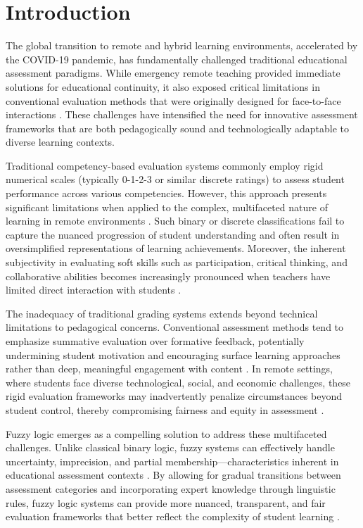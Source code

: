 

\section{Introduction}

The global transition to remote and hybrid learning environments, accelerated by the COVID-19 pandemic, has fundamentally challenged traditional educational assessment paradigms. While emergency remote teaching provided immediate solutions for educational continuity, it also exposed critical limitations in conventional evaluation methods that were originally designed for face-to-face interactions \cite{Martinez2022}. These challenges have intensified the need for innovative assessment frameworks that are both pedagogically sound and technologically adaptable to diverse learning contexts.

Traditional competency-based evaluation systems commonly employ rigid numerical scales (typically 0-1-2-3 or similar discrete ratings) to assess student performance across various competencies. However, this approach presents significant limitations when applied to the complex, multifaceted nature of learning in remote environments \cite{Chen2024}. Such binary or discrete classifications fail to capture the nuanced progression of student understanding and often result in oversimplified representations of learning achievements. Moreover, the inherent subjectivity in evaluating soft skills such as participation, critical thinking, and collaborative abilities becomes increasingly pronounced when teachers have limited direct interaction with students \cite{Kumar2024}.

The inadequacy of traditional grading systems extends beyond technical limitations to pedagogical concerns. Conventional assessment methods tend to emphasize summative evaluation over formative feedback, potentially undermining student motivation and encouraging surface learning approaches rather than deep, meaningful engagement with content \cite{Anderson2022}. In remote settings, where students face diverse technological, social, and economic challenges, these rigid evaluation frameworks may inadvertently penalize circumstances beyond student control, thereby compromising fairness and equity in assessment \cite{Brown2023}.

Fuzzy logic emerges as a compelling solution to address these multifaceted challenges. Unlike classical binary logic, fuzzy systems can effectively handle uncertainty, imprecision, and partial membership—characteristics inherent in educational assessment contexts \cite{Johnson2023}. By allowing for gradual transitions between assessment categories and incorporating expert knowledge through linguistic rules, fuzzy logic systems can provide more nuanced, transparent, and fair evaluation frameworks that better reflect the complexity of student learning \cite{Garcia2024}.

